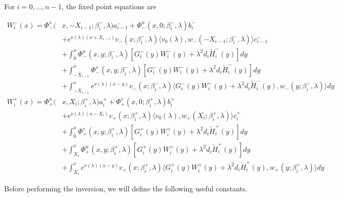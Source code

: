 \documentclass[12pt]{article}
\begin{document}
For $i = 0, \dots, n-1$, the fixed point equations are

\begin{align*}
W_i^-(x) = \Phi^s_-(&x, -X_{i-1}; \beta_i^-, \lambda) a_{i-1}^- + \Phi^u_-(x, 0; \beta_i^-, \lambda) b_i^- \\
&+ e^{\nu(\lambda)(x+X_{i-1})} v_-(x; \beta_i^-, \lambda) \langle v_0(\lambda), w_-(-X_{i-1}; \beta_i^-, \lambda) \rangle c_{i-1}^- \\
&+ \int_0^x \Phi^u_-(x, y; \beta_i^-, \lambda)[ G_i^-(y)W_i^-(y) + \lambda^2 d_i \tilde{H}_i^-(y) ] dy \\
&+ \int_{-X_{i-1}}^x \Phi^s_-(x, y; \beta_i^-, \lambda) [ G_i^-(y)W_i^-(y) + \lambda^2 d_i \tilde{H}_i^-(y) ] dy \\
&+ \int_{-X_{i-1}}^x 
e^{\nu(\lambda)(x-y)} v_-(x; \beta_i^-, \lambda) \langle G_i^-(y)W_i^-(y) + \lambda^2 d_i \tilde{H}_i^-(y), w_-(y; \beta_i^-, \lambda) \rangle dy \\
W_i^+(x) = \Phi^u_+(&x, X_i; \beta_i^+, \lambda)a_i^+ + \Phi^s_+(x, 0; \beta_i^+, \lambda)b_i^+ \\
&+ e^{\nu(\lambda)(x - X_i)} v_+(x; \beta_i^+, \lambda) \langle v_0(\lambda), w_+(X_i; \beta_i^+, \lambda) \rangle c_i^+ \\
&+ \int_0^x \Phi^s_+(x, y; \beta_i^+, \lambda) [ G_i^+(y)W_i^+(y) + \lambda^2 d_i \tilde{H}_i^+(y) ] dy \\
&+ \int_{X_i}^x \Phi^u_+(x, y; \beta_i^+, \lambda) [ G_i^+(y)W_i^+(y) + \lambda^2 d_i \tilde{H}_i^+(y) ] dy \\
&+ \int_{X_i}^x e^{\nu(\lambda)(x-y)} v_+(x; \beta_i^+, \lambda) \langle G_i^+(y)W_i^+(y) + \lambda^2 d_i \tilde{H}_i^+(y), w_+(y; \beta_i^+, \lambda) \rangle dy
\end{align*}

Before performing the inversion, we will define the following useful constants.
\end{document}
